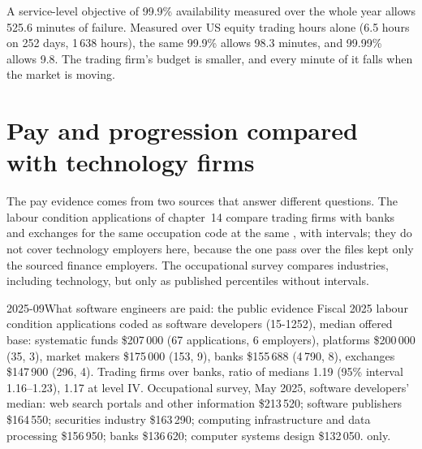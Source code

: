 \begin{example}\label{ex:in:software-engineer:budget}
A service-level objective of 99.9\% availability measured over the whole year allows 525.6 minutes of failure. Measured
over US equity trading hours alone (6.5 hours on 252 days, 1\,638 hours), the same 99.9\% allows 98.3 minutes, and 99.99\%
allows 9.8. The trading firm's budget is smaller, and every minute of it falls when the market is moving.
\end{example}

\section{Pay and progression compared with technology firms}

The pay evidence comes from two sources that answer different questions. The labour condition applications of
chapter~14 compare trading firms with banks and exchanges for the same occupation code at the same , with
intervals; they do not cover technology employers here, because the one pass over the files kept only the sourced finance
employers. The occupational survey compares industries, including technology, but only as published percentiles without
intervals.

\begin{dated}{2025-09}{What software engineers are paid: the public evidence}\label{dat:in:software-engineer:pay}
Fiscal 2025 labour condition applications coded as software developers (15-1252), median offered base: systematic funds
\$207\,000 (67 applications, 6 employers), platforms \$200\,000 (35, 3), market makers \$175\,000 (153, 9), banks
\$155\,688 (4\,790, 8), exchanges \$147\,900 (296, 4). Trading firms over banks, ratio of medians 1.19 (95\% interval
1.16--1.23), 1.17 at level IV. Occupational survey, May 2025, software developers' median: web search portals and other
information \$213\,520; software publishers \$164\,550; securities industry \$163\,290; computing infrastructure and data
processing \$156\,950; banks \$136\,620; computer systems design \$132\,050.  only.
\end{dated}

